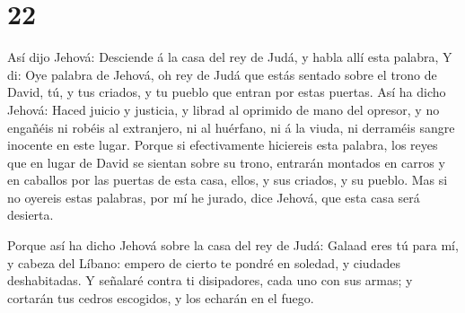 \hypertarget{section-21}{%
\section{22}\label{section-21}}

 Así dijo Jehová: Desciende á la casa del rey de Judá, y
habla allí esta palabra,  Y di: Oye palabra de Jehová, oh
rey de Judá que estás sentado sobre el trono de David, tú, y tus
criados, y tu pueblo que entran por estas puertas.  Así ha
dicho Jehová: Haced juicio y justicia, y librad al oprimido de mano del
opresor, y no engañéis ni robéis al extranjero, ni al huérfano, ni á la
viuda, ni derraméis sangre inocente en este lugar.  Porque
si efectivamente hiciereis esta palabra, los reyes que en lugar de David
se sientan sobre su trono, entrarán montados en carros y en caballos por
las puertas de esta casa, ellos, y sus criados, y su pueblo.
 Mas si no oyereis estas palabras, por mí he jurado, dice
Jehová, que esta casa será desierta.

 Porque así ha dicho Jehová sobre la casa del rey de Judá:
Galaad eres tú para mí, y cabeza del Líbano: empero de cierto te pondré
en soledad, y ciudades deshabitadas.  Y señalaré contra ti
disipadores, cada uno con sus armas; y cortarán tus cedros escogidos, y
los echarán en el fuego.

